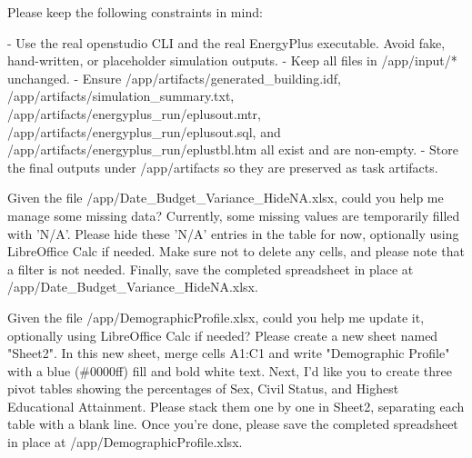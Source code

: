 \documentclass{llmxive}
\begin{document}
\begin{instructionbox}
Please keep the following constraints in mind:

- Use the real \textasciigrave{}openstudio\textasciigrave{} CLI and the real EnergyPlus executable. Avoid fake, hand-written, or placeholder simulation outputs.
- Keep all files in \textasciigrave{}/app/input/*\textasciigrave{} unchanged.
- Ensure \textasciigrave{}/app/artifacts/generated\_building.idf\textasciigrave{}, \textasciigrave{}/app/artifacts/simulation\_summary.txt\textasciigrave{}, \textasciigrave{}/app/artifacts/energyplus\_run/eplusout.mtr\textasciigrave{}, \textasciigrave{}/app/artifacts/energyplus\_run/eplusout.sql\textasciigrave{}, and \textasciigrave{}/app/artifacts/energyplus\_run/eplustbl.htm\textasciigrave{} all exist and are non-empty.
- Store the final outputs under \textasciigrave{}/app/artifacts\textasciigrave{} so they are preserved as task artifacts.
\end{instructionbox}

\begin{instructionbox}
Given the file \textasciigrave{}/app/Date\_Budget\_Variance\_HideNA.xlsx\textasciigrave{}, could you help me manage some missing data? Currently, some missing values are temporarily filled with 'N/A'. Please hide these 'N/A' entries in the table for now, optionally using LibreOffice Calc if needed. Make sure not to delete any cells, and please note that a filter is not needed. Finally, save the completed spreadsheet in place at \textasciigrave{}/app/Date\_Budget\_Variance\_HideNA.xlsx\textasciigrave{}.
\end{instructionbox}

\begin{instructionbox}
Given the file \textasciigrave{}/app/DemographicProfile.xlsx\textasciigrave{}, could you help me update it, optionally using LibreOffice Calc if needed? Please create a new sheet named "Sheet2". In this new sheet, merge cells A1:C1 and write "Demographic Profile" with a blue (\#0000ff) fill and bold white text. Next, I'd like you to create three pivot tables showing the percentages of Sex, Civil Status, and Highest Educational Attainment. Please stack them one by one in Sheet2, separating each table with a blank line. Once you're done, please save the completed spreadsheet in place at \textasciigrave{}/app/DemographicProfile.xlsx\textasciigrave{}.
\end{instructionbox}
\end{document}
